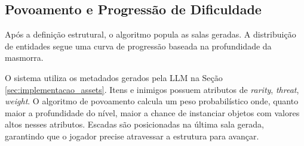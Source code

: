 \begin{algorithm}[H]
    \caption{Geração Procedural da Estrutura da Masmorra}
    \label{alg:dungeon_gen_high_level}
    \SetAlgoLined



\end{algorithm}

\subsection{Povoamento e Progressão de Dificuldade}

Após a definição estrutural, o algoritmo popula as salas geradas. A distribuição
de entidades segue uma curva de progressão baseada na profundidade da masmorra.

O sistema utiliza os metadados gerados pela LLM na Seção
\ref{sec:implementacao_assets}. Itens e inimigos possuem atributos de
\textit{rarity}, \textit{threat}, \textit{weight}. O algoritmo de povoamento
calcula um peso probabilístico onde, quanto maior a profundidade do nível, maior
a chance de instanciar objetos com valores altos nesses atributos. Escadas são
posicionadas na última sala gerada, garantindo que o jogador precise atravessar
a estrutura para avançar.

